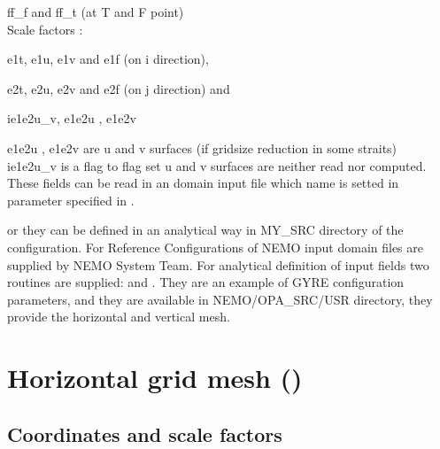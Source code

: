 \documentclass[../main/NEMO_manual]{subfiles}
\begin{document}
 ff\_f  and  ff\_t (at T and F point)\\
Scale factors : 
 
 e1t, e1u, e1v and e1f (on i direction),

 e2t, e2u, e2v and e2f (on j direction) and

 ie1e2u\_v, e1e2u , e1e2v   
 
e1e2u , e1e2v are u and v surfaces (if gridsize reduction in some straits)\\
ie1e2u\_v is a flag to flag set u and  v surfaces are neither read nor computed.\\
 
These fields can be read in an domain input file which name is setted in
 parameter specified in .

or they can be defined in an analytical way in MY\_SRC directory of the configuration.
For Reference Configurations of NEMO input domain files are supplied by NEMO System Team.
For analytical definition of input fields two routines are supplied:  and .
They are an example of GYRE configuration parameters, and they are available in NEMO/OPA\_SRC/USR directory,
they provide the horizontal and vertical mesh. 


\section{Horizontal grid mesh (\protect{})}
\label{sec:DOM_hgr}

\subsection{Coordinates and scale factors}
\label{subsec:DOM_hgr_coord_e}
\end{document}
